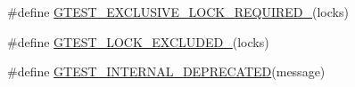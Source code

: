 \begin{DoxyCompactItemize}
$$\item 
\#define \mbox{\hyperlink{_obj__test_2lib_2googletest-master_2googletest_2include_2gtest_2internal_2gtest-port_8h_a149f693bd59fa1bc937af54c0cdcb32f}{G\+T\+E\+S\+T\+\_\+\+E\+X\+C\+L\+U\+S\+I\+V\+E\+\_\+\+L\+O\+C\+K\+\_\+\+R\+E\+Q\+U\+I\+R\+E\+D\+\_\+}}(locks)
\item 
\#define \mbox{\hyperlink{_obj__test_2lib_2googletest-master_2googletest_2include_2gtest_2internal_2gtest-port_8h_a69abff5a4efdd07bd5faebe3dd318d06}{G\+T\+E\+S\+T\+\_\+\+L\+O\+C\+K\+\_\+\+E\+X\+C\+L\+U\+D\+E\+D\+\_\+}}(locks)
\item 
\#define \mbox{\hyperlink{_obj__test_2lib_2googletest-master_2googletest_2include_2gtest_2internal_2gtest-port_8h_a6aa594029905b65753d0e85f2db521ab}{G\+T\+E\+S\+T\+\_\+\+I\+N\+T\+E\+R\+N\+A\+L\+\_\+\+D\+E\+P\+R\+E\+C\+A\+T\+ED}}(message)
\end{DoxyCompactItemize}
